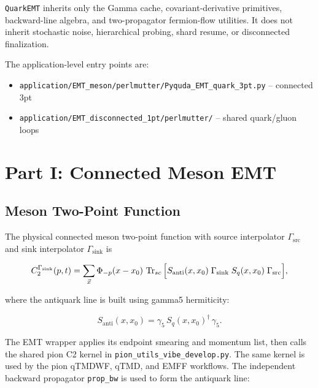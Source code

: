 \documentclass[11pt,a4paper]{article}
\newcommand{\code}[1]{\texttt{#1}}
\begin{document}
\code{QuarkEMT} inherits only the Gamma cache, covariant-derivative
primitives, backward-line algebra, and two-propagator fermion-flow utilities.
It does not inherit stochastic noise, hierarchical probing, shard resume, or
disconnected finalization.

The application-level entry points are:
\begin{itemize}[nosep]
  \item \code{application/EMT\_meson/perlmutter/Pyquda\_EMT\_quark\_3pt.py} -- connected 3pt
  \item \code{application/EMT\_disconnected\_1pt/perlmutter/} -- shared quark/gluon loops
\end{itemize}

\section{Part I: Connected Meson EMT}
\label{sec:connected}

\subsection{Meson Two-Point Function}
\label{sec:2pt}

The physical connected meson two-point function with source interpolator $\Gamma_{\text{src}}$ and sink interpolator $\Gamma_{\text{sink}}$ is

\begin{equation}\label{eq:C2_def}
  C_2^{\Gamma_{\text{sink}}}(p, t)
    = \sum_{\vec{x}} \Phi_{-p}(x - x_0)\,
      \Tr_{sc}\Big[
        S_{\text{anti}}(x, x_0)\; \Gamma_{\text{sink}}\;
        S_q(x, x_0)\; \Gamma_{\text{src}}
      \Big],
\end{equation}

where the antiquark line is built using gamma5 hermiticity:

\begin{equation}\label{eq:S_anti}
  S_{\text{anti}}(x, x_0) = \gamma_5\, S_q(x, x_0)^\dagger\, \gamma_5.
\end{equation}

The EMT wrapper applies its endpoint smearing and momentum list, then calls the
shared pion C2 kernel in \code{pion\_utils\_vibe\_develop.py}.  The same kernel
is used by the pion qTMDWF, qTMD, and EMFF workflows.  The independent backward
propagator \code{prop\_bw} is used to form the antiquark line:
\end{document}
